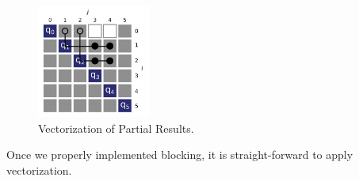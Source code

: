 \begin{figure}[htb]\centering
	\includegraphics[width=0.33\textwidth]{img/vectorized_blocking.png}
  \caption{Vectorization of Partial Results.\label{fig:vec-blocking}}
\end{figure}

 Once we properly implemented blocking, it is
straight-forward to apply vectorization.
